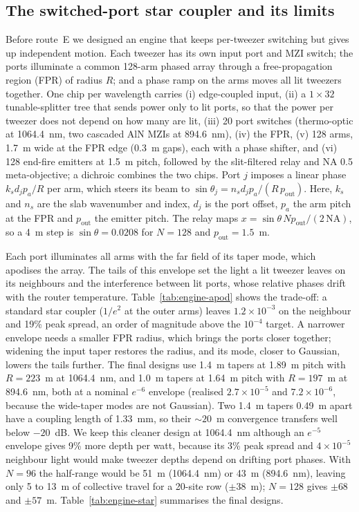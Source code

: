 \subsection{The switched-port star coupler and its limits}\label{sec:engine-star}

Before route~E we designed an engine that keeps per-tweezer switching but gives up independent motion. Each tweezer has its own input port and MZI switch; the ports illuminate a common 128-arm phased array through a free-propagation region (FPR) of radius $R$; and a phase ramp on the arms moves all lit tweezers together. One chip per wavelength carries (i) edge-coupled input, (ii) a $1\times32$ tunable-splitter tree that sends power only to lit ports, so that the power per tweezer does not depend on how many are lit, (iii) 20 port switches (thermo-optic at 1064.4~nm, two cascaded AlN MZIs at 894.6~nm), (iv) the FPR, (v) 128 arms, 1.7~\textmu m wide at the FPR edge (0.3~\textmu m gaps), each with a phase shifter, and (vi) 128 end-fire emitters at 1.5~\textmu m pitch, followed by the slit-filtered relay and NA 0.5 meta-objective; a dichroic combines the two chips. Port $j$ imposes a linear phase $k_s d_j p_a/R$ per arm, which steers its beam to $\sin\theta_j = n_s d_j p_a/(R\,p_\mathrm{out})$. Here, $k_s$ and $n_s$ are the slab wavenumber and index, $d_j$ is the port offset, $p_a$ the arm pitch at the FPR and $p_\mathrm{out}$ the emitter pitch. The relay maps $x = \sin\theta\,N p_\mathrm{out}/(2\,\mathrm{NA})$, so a 4~\textmu m step is $\sin\theta = 0.0208$ for $N = 128$ and $p_\mathrm{out} = 1.5$~\textmu m.

Each port illuminates all arms with the far field of its taper mode, which apodises the array. The tails of this envelope set the light a lit tweezer leaves on its neighbours and the interference between lit ports, whose relative phases drift with the router temperature. Table~\ref{tab:engine-apod} shows the trade-off: a standard star coupler ($1/e^2$ at the outer arms) leaves $1.2\times10^{-3}$ on the neighbour and 19\% peak spread, an order of magnitude above the $10^{-4}$ target. A narrower envelope needs a smaller FPR radius, which brings the ports closer together; widening the input taper restores the radius, and its mode, closer to Gaussian, lowers the tails further. The final designs use 1.4~\textmu m tapers at 1.89~\textmu m pitch with $R = 223$~\textmu m at 1064.4~nm, and 1.0~\textmu m tapers at 1.64~\textmu m pitch with $R = 197$~\textmu m at 894.6~nm, both at a nominal $e^{-6}$ envelope (realised $2.7\times10^{-5}$ and $7.2\times10^{-6}$, because the wide-taper modes are not Gaussian). Two 1.4~\textmu m tapers 0.49~\textmu m apart have a coupling length of 1.33~mm, so their ${\sim}20$~\textmu m convergence transfers well below $-20$~dB. We keep this cleaner design at 1064.4~nm although an $e^{-5}$ envelope gives 9\% more depth per watt, because its 3\% peak spread and $4\times10^{-5}$ neighbour light would make tweezer depths depend on drifting port phases. With $N = 96$ the half-range would be 51~\textmu m (1064.4~nm) or 43~\textmu m (894.6~nm), leaving only 5 to 13~\textmu m of collective travel for a 20-site row ($\pm38$~\textmu m); $N = 128$ gives $\pm68$ and $\pm57$~\textmu m. Table~\ref{tab:engine-star} summarises the final designs.

